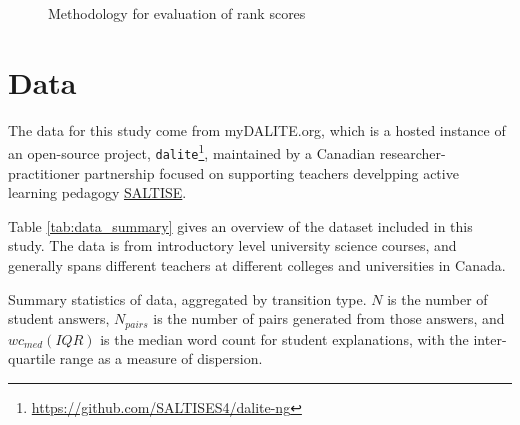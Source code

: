 \documentclass[acmsmall]{acmart}
\begin{document}
\begin{figure}
	\caption{Methodology for evaluation of rank scores}
	\label{fig:evaluate_rankings}
\end{figure}


\section{Data}

The data for this study come from myDALITE.org, which is a hosted instance of 
an open-source project, 
\verb|dalite|\footnote{\url{https://github.com/SALTISES4/dalite-ng}}, 
maintained by a Canadian researcher-practitioner partnership focused on 
supporting teachers develpping active learning pedagogy 
\href{saltise.ca}{SALTISE}.

Table \ref{tab:data_summary} gives an overview of the dataset included in this 
study.
The data is from introductory level university science courses, and generally 
spans different teachers at different colleges and universities in Canada. 
 
\begin{table}
	
	\caption{
		Summary statistics of data, aggregated by transition type. 
		$N$ is the number of student answers, $N_{pairs}$ is the number of 
		pairs generated from those answers, and $wc_{med} (IQR)$ is the median 
		word 
		count 
		for student explanations, with the inter-quartile range as a measure of 
		dispersion. 
	}
	\label{tab:data_summary}
\end{table}
\end{document}
